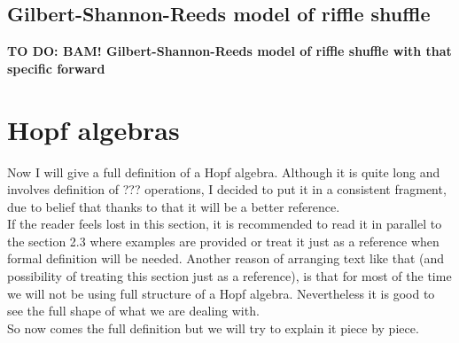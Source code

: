 \documentclass[a4paper, 12pt]{report}
\newcommand{\todo}[1]{\hfill \break \textbf{\Huge TO DO: #1 \hfill \break}\normalsize}
\begin{document}
\section{Gilbert-Shannon-Reeds model of riffle shuffle}
\todo{BAM! Gilbert-Shannon-Reeds model of riffle shuffle with that specific forward}
\chapter{Hopf algebras}
%
Now I will give a full definition of a Hopf algebra. Although it is quite long and involves
definition of ??? operations, I decided to put it in a consistent fragment, due to belief
that thanks to that it will be a better reference. \\
If the reader feels lost in this section, it is recommended to read it in parallel to the section 2.3
where examples are provided or treat it just as a reference when formal definition will be needed.
Another reason of arranging text like that (and possibility of treating this section just as a reference),
is that for most of the time we will not be using full structure of a Hopf algebra. Nevertheless it is good
to see the full shape of what we are dealing with. \\
So now comes the full definition but we will try to explain it piece by piece. \\[8pt]
\end{document}
